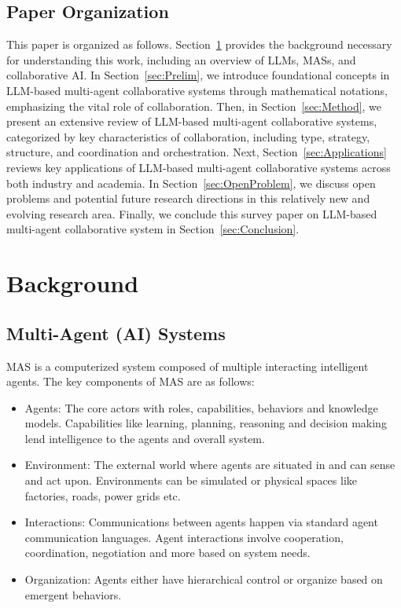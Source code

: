 \documentclass[acmsmall,nonacm]{acmart}
\begin{document}
    \subsection{Paper Organization}
        This paper is organized as follows. Section~\ref{sec:Background} provides the background necessary for understanding this work, including an overview of LLMs, MASs, and collaborative AI. In Section~\ref{sec:Prelim}, we introduce foundational concepts in LLM-based multi-agent collaborative systems through mathematical notations, emphasizing the vital role of collaboration. Then, in Section~\ref{sec:Method}, we present an extensive review of LLM-based multi-agent collaborative systems, categorized by key characteristics of collaboration, including type, strategy, structure, and coordination and orchestration. 
        Next, Section~\ref{sec:Applications} reviews key applications of LLM-based multi-agent collaborative systems across both industry and academia. In Section~\ref{sec:OpenProblem}, we discuss open problems and potential future research directions in this relatively new and evolving research area. Finally, we conclude this survey paper on LLM-based multi-agent collaborative system in Section~\ref{sec:Conclusion}. %

\section{Background} \label{sec:Background}
    \subsection{Multi-Agent (AI) Systems}
        MAS is a computerized system composed of multiple interacting intelligent agents. The key components of MAS are as follows:
        \begin{itemize}
            \item Agents: The core actors with roles, capabilities, behaviors and knowledge models. Capabilities like learning, planning, reasoning and decision making lend intelligence to the agents and overall system.
            \item Environment: The external world where agents are situated in and can sense and act upon. Environments can be simulated or physical spaces like factories, roads, power grids etc.
            \item Interactions: Communications between agents happen via standard agent communication languages. Agent interactions involve cooperation, coordination, negotiation and more based on system needs.
            \item Organization: Agents either have hierarchical control or organize based on emergent behaviors.
        \end{itemize}
\end{document}
